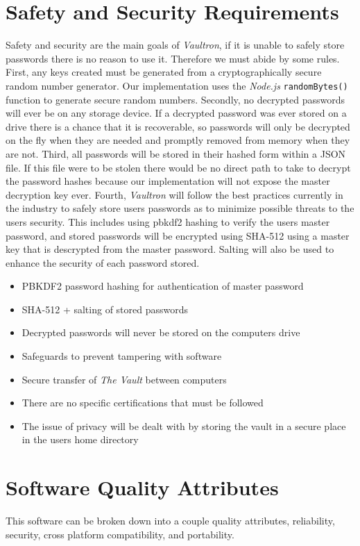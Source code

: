 \documentclass[11pt]{report}
\newenvironment{myitemize}
{ \begin{itemize}
    \setlength{\itemsep}{0pt}
    \setlength{\parskip}{0pt}
    \setlength{\parsep}{0pt}     }
{ \end{itemize}                  }
\begin{document}
\section{Safety and Security Requirements}
Safety and security are the main goals of \textit{Vaultron}, if it is
unable to safely store passwords there is no reason to use it. Therefore
we must abide by some rules. First, any keys created must be generated
from a cryptographically secure random number generator. Our implementation
uses the \textit{Node.js} \texttt{randomBytes()} function to generate
secure random numbers. Secondly, no decrypted passwords will ever be
on any storage device. If a decrypted password was ever stored on a drive
there is a chance that it is recoverable, so passwords will only be 
decrypted on the fly when they are needed and promptly removed from
memory when they are not. Third, all passwords will be stored in their
hashed form within a JSON file. If this file were to be stolen there
would be no direct path to take to decrypt the password hashes because
our implementation will not expose the master decryption key ever. 
Fourth, \textit{Vaultron} will follow the best practices currently in the
industry to safely store users passwords as to minimize possible threats
to the users security. This includes using pbkdf2 hashing to verify
the users master password, and stored passwords will be encrypted using
SHA-512 using a master key that is descrypted from the master password.
Salting will also be used to enhance the security of each password stored.

\begin{myitemize}
    \item PBKDF2 password hashing for authentication of master password
    \item SHA-512 + salting of stored passwords
    \item Decrypted passwords will never be stored on the computers drive
    \item Safeguards to prevent tampering with software
    \item Secure transfer of \textit{The Vault} between computers
    \item There are no specific certifications that must be followed
    \item The issue of privacy will be dealt with by storing the vault in a secure place in the users home directory
\end{myitemize}


\section{Software Quality Attributes}
This software can be broken down into a couple quality attributes,
reliability, security, cross platform compatibility, and portability.
\end{document}

